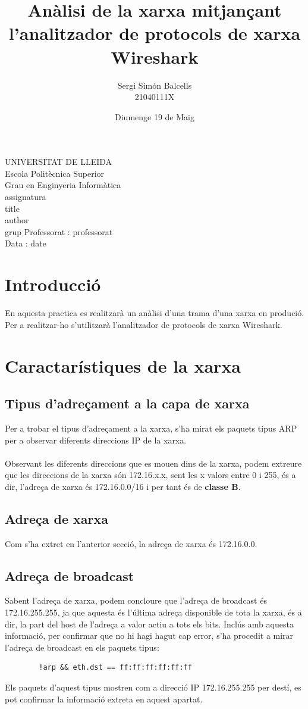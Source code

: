 \documentclass{article}
\title{Anàlisi de la xarxa mitjançant l'analitzador de protocols de xarxa Wireshark}
\author{Sergi Simón Balcells\\21040111X}
\date{Diumenge 19 de Maig}
\renewcommand{\maketitle}{ %
    \begin{titlepage}
        \raggedright{UNIVERSITAT DE LLEIDA \\
            Escola Politècnica Superior \\
            Grau en Enginyeria Informàtica\\
            \1assignatura\\}
            \vspace{5cm}
            \centering\huge{\5title \\}
            \vspace{3cm}
            \large{\6author} \\
            \normalsize{\3grup}
            \vfill
            Professorat : \4professorat \\
            Data : \7date
\end{titlepage}}
\begin{document}
\maketitle
\thispagestyle{empty}

\newpage
{}
\tableofcontents
\listoffigures
\listoftables
\newpage
{}
\section{Introducció}
En aquesta practica es realitzarà un anàlisi d'una trama 
d'una xarxa en produció. Per a realitzar-ho s'utilitzarà
l'analitzador de protocols de xarxa Wireshark.
\section{Caractarístiques de la xarxa}
\subsection{Tipus d'adreçament a la capa de xarxa}
Per a trobar el tipus d'adreçament a la xarxa, s'ha mirat els paquets
tipus ARP per a observar diferents direccions IP de la xarxa.\\
\\
Observant les diferents direccions que es mouen dins de la xarxa, podem
extreure que les direccions de la xarxa són 172.16.x.x, sent les x valors
entre 0 i 255, és a dir, l'adreça de xarxa és 172.16.0.0/16 i per tant
és de  \textbf{classe B}.
\subsection{Adreça de xarxa}
Com s'ha extret en l'anterior secció, la adreça de xarxa és 172.16.0.0.
\subsection{Adreça de broadcast}
Sabent l'adreça de xarxa, podem concloure que
l'adreça de broadcast és 172.16.255.255, ja que aquesta és l'última adreça
disponible de tota la xarxa, és a dir, la part del host de l'adreça a valor
actiu a tots els bits. Inclús amb aquesta informació, per confirmar que no
hi hagi hagut cap error, s'ha procedit a mirar l'adreça de broadcast en els
paquets tipus:\\
\begin{lstlisting}
	    !arp && eth.dst == ff:ff:ff:ff:ff:ff
\end{lstlisting}
Els paquets d'aquest tipus mostren com a direcció IP 172.16.255.255 per destí,
es pot confirmar la informació extreta en aquest apartat.
\end{document}
